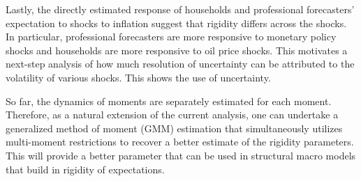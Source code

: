 \documentclass[12pt]{article}
\begin{document}
	Lastly, the directly estimated response of households and professional forecasters' expectation to shocks to inflation suggest that rigidity differs across the shocks. In particular, professional forecasters are more responsive to monetary policy shocks and households are more responsive to oil price shocks. This motivates a next-step analysis of how much resolution of uncertainty can be attributed to the volatility of various shocks. This shows the use of uncertainty.
	
	So far, the dynamics of moments are separately estimated for each moment. Therefore, as a natural extension of the current analysis, one can undertake a generalized method of moment (GMM) estimation that simultaneously utilizes multi-moment restrictions to recover a better estimate of the rigidity parameters.  This will provide a better parameter that can be used in structural macro models that build in rigidity of expectations. 
	
	
	
	
\end{document}
